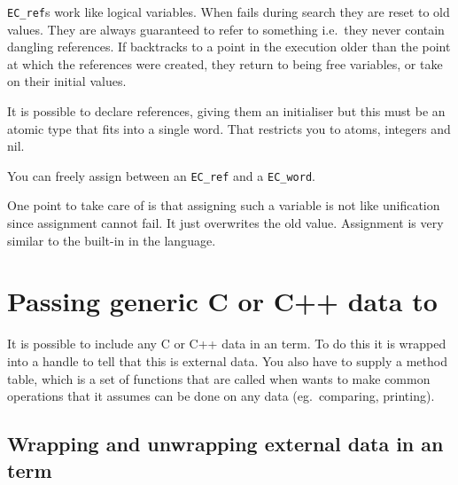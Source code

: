 \verb.EC_ref.s work like logical variables. When {\eclipse} fails during search
they are reset to old values. They are always guaranteed to refer to
something i.e.\ they never contain dangling references.
If {\eclipse} backtracks to a point in the execution
older than the point at which the references were created, they
return to being free variables, or take on their initial values.

It is possible to declare references, giving them an initialiser
but this must be an atomic type that fits into a single word. That
restricts you to atoms, integers and nil.

You can freely assign between an \verb.EC_ref. and a \verb.EC_word..

One point to take care of is that assigning such a variable
is not like unification since assignment cannot fail. It
just overwrites the old value. Assignment is very similar
to the  built-in in the {\eclipse} language.


\section{Passing generic C or C++ data to {\eclipse}}

It is possible to include any C or C++ data in an {\eclipse} term. To do this
it is wrapped into a handle to tell {\eclipse} that this is external data.
You also have to supply a method table, which is a set of functions
that are called when {\eclipse} wants to make common operations that it
assumes can be done on any data (eg.\ comparing, printing).


\subsection{Wrapping and unwrapping external data in an {\eclipse} term}

